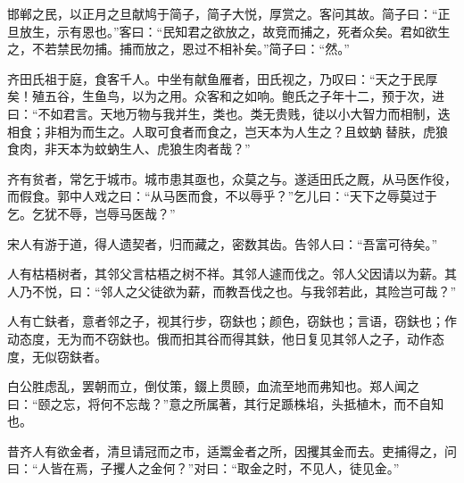 \documentclass[]{article}
\begin{document}
邯郸之民，以正月之旦献鸠于简子，简子大悦，厚赏之。客问其故。简子曰：``正旦放生，示有恩也。''客曰：``民知君之欲放之，故竞而捕之，死者众矣。君如欲生之，不若禁民勿捕。捕而放之，恩过不相补矣。''简子曰：``然。''

齐田氏祖于庭，食客千人。中坐有献鱼雁者，田氏视之，乃叹曰：``天之于民厚矣！殖五谷，生鱼鸟，以为之用。众客和之如响。鲍氏之子年十二，预于次，进曰：``不如君言。天地万物与我并生，类也。类无贵贱，徒以小大智力而相制，迭相食；非相为而生之。人取可食者而食之，岂天本为人生之？且蚊蚋替肤，虎狼食肉，非天本为蚊蚋生人、虎狼生肉者哉？''

齐有贫者，常乞于城市。城市患其亟也，众莫之与。遂适田氏之厩，从马医作役，而假食。郭中人戏之曰：``从马医而食，不以辱乎？''乞儿曰：``天下之辱莫过于乞。乞犹不辱，岂辱马医哉？''

宋人有游于道，得人遗契者，归而藏之，密数其齿。告邻人曰：``吾富可待矣。''

人有枯梧树者，其邻父言枯梧之树不祥。其邻人遽而伐之。邻人父因请以为薪。其人乃不悦，曰：``邻人之父徒欲为薪，而教吾伐之也。与我邻若此，其险岂可哉？''

人有亡鈇者，意者邻之子，视其行步，窃鈇也；颜色，窃鈇也；言语，窃鈇也；作动态度，无为而不窃鈇也。俄而抇其谷而得其鈇，他日复见其邻人之子，动作态度，无似窃鈇者。

白公胜虑乱，罢朝而立，倒仗策，錣上贯颐，血流至地而弗知也。郑人闻之曰：``颐之忘，将何不忘哉？''意之所属著，其行足踬株埳，头抵植木，而不自知也。

昔齐人有欲金者，清旦请冠而之市，适鬻金者之所，因攫其金而去。吏捕得之，问曰：``人皆在焉，子攫人之金何？''对曰：``取金之时，不见人，徒见金。''
\end{document}
